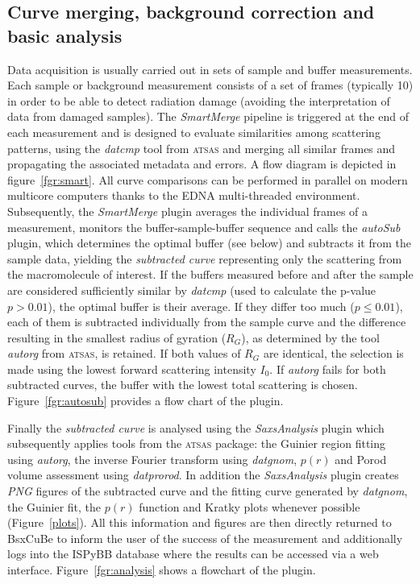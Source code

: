 \documentclass[preprint,pdf]{iucr}              %
\begin{document}
\subsection{Curve merging, background correction and basic analysis}
\label{SM}
Data acquisition is usually carried out in sets of sample and buffer
measurements.
Each sample or background measurement consists of a set of frames
(typically 10) in order to be able to detect radiation damage
(avoiding the interpretation of data from damaged samples).
The \textit{SmartMerge} pipeline is triggered at the end of each measurement
and is designed to evaluate similarities among scattering
patterns, using the \textit{datcmp} tool from \textsc{atsas} and merging all
similar frames and propagating the associated metadata and
errors.
A flow diagram is depicted in figure~\ref{fgr:smart}.
All curve comparisons can be performed in parallel on modern multicore
computers thanks to the EDNA multi-threaded environment.
Subsequently, the \textit{SmartMerge} plugin averages the individual frames
of a measurement, monitors the buffer-sample-buffer sequence and
 calls the \textit{autoSub} plugin, which determines the optimal buffer
(see below) and subtracts it from the sample data, yielding the 
\textit{subtracted curve} representing only the scattering from the
macromolecule of interest.
If the buffers measured before and after the sample are considered sufficiently
similar by \textit{datcmp} (used to calculate the p-value $p > 0.01$), the
optimal buffer is their average.
If they differ too much ($p \leq 0.01$), each of them is subtracted individually from the
sample curve and the difference resulting in  the smallest radius of
gyration ($R_{G}$), as determined by the tool \textit{autorg} from \textsc{atsas}, is retained.
If both values of $R_{G}$ are identical, the selection is made using the lowest forward scattering intensity $I_{0}$.
If \textit{autorg} fails for both subtracted curves, the buffer with the lowest
total scattering is chosen.
Figure~\ref{fgr:autosub} provides a flow chart of the plugin.

Finally the \textit{subtracted curve} is analysed using the
\textit{SaxsAnalysis} plugin which subsequently applies tools from the
\textsc{atsas} package: the Guinier region fitting using \textit{autorg}, 
the inverse Fourier transform using \textit{datgnom}, 
$p(r)$ and Porod volume assessment using \textit{datprorod}.
In addition the \textit{SaxsAnalysis} plugin creates \textit{PNG} figures of
the subtracted curve and the fitting curve generated by \textit{datgnom}, the
Guinier fit, the $p(r)$ function and Kratky plots whenever possible (Figure~\ref{plots}).
All this information and figures are then directly returned to BsxCuBe to inform
the user of the success of the measurement and additionally logs into the
ISPyBB database \cite{ISPYBB} where the results can be accessed via a web
interface.
Figure~\ref{fgr:analysis} shows a flowchart of the plugin.
\end{document}
